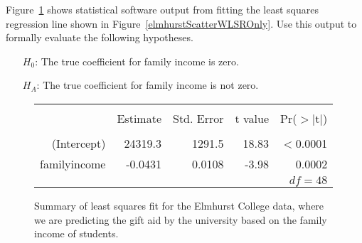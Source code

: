 \begin{exercisewrap}
\begin{nexercise}
Figure~\ref{rOutputForIncomeAidLSRLineInInferenceSection}
shows statistical software output from fitting the least
squares regression line shown in
Figure~\ref{elmhurstScatterWLSROnly}.
Use this output to formally evaluate the following
hypotheses.\footnotemark{}
\begin{itemize}
\setlength{\itemsep}{0mm}
\item[$H_0$:]
    The true coefficient for family income is zero.
\item[$H_A$:]
    The true coefficient for family income is not zero.
\end{itemize}
\end{nexercise}
\end{exercisewrap}

\begin{figure}[ht]
\centering
\begin{tabular}{rrrrr}
  \hline
  \vspace{-3.7mm} & & & & \\
 & Estimate & Std. Error & t value & Pr($>$$|$t$|$) \\ 
  \hline
  \vspace{-3.6mm} & & & & \\
(Intercept) & 24319.3 & 1291.5 & 18.83 & $<$0.0001 \\ 
family\us{}income & -0.0431 & 0.0108 & -3.98 & 0.0002 \\ 
   \hline
   \multicolumn{5}{r}{$df=48$} \\
\end{tabular}
\caption{Summary of least squares fit for the Elmhurst
    College data, where we are predicting the gift aid
    by the university based on the family income of
    students.}
\label{rOutputForIncomeAidLSRLineInInferenceSection}
\end{figure}


